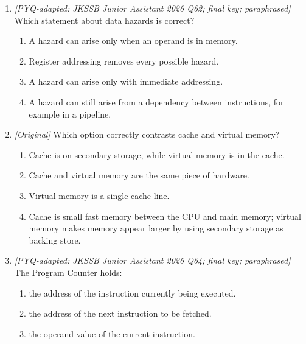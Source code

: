 \documentclass[11pt]{article}
\begin{document}
\begin{enumerate}[label=\textbf{Q\arabic*.}, leftmargin=*]
  \begin{enumerate}[label=\Alph*.]
    \item The cache is located on secondary storage.
    \item The cache stores only instructions, never data.
    \item The cache is smaller and faster and sits closer to the CPU, so its
      access time is lower than main memory.
    \item The cache runs at the same speed as a hard disk.
  \end{enumerate}
\item \textit{[PYQ-adapted: JKSSB Junior Assistant 2026 Q62; final key;
paraphrased]} Which statement about data hazards is correct?
  \begin{enumerate}[label=\Alph*.]
    \item A hazard can arise only when an operand is in memory.
    \item Register addressing removes every possible hazard.
    \item A hazard can arise only with immediate addressing.
    \item A hazard can still arise from a dependency between instructions,
      for example in a pipeline.
  \end{enumerate}
\item \textit{[Original]} Which option correctly contrasts cache and virtual
memory?
  \begin{enumerate}[label=\Alph*.]
    \item Cache is on secondary storage, while virtual memory is in the
      cache.
    \item Cache and virtual memory are the same piece of hardware.
    \item Virtual memory is a single cache line.
    \item Cache is small fast memory between the CPU and main memory;
      virtual memory makes memory appear larger by using secondary storage as
      backing store.
  \end{enumerate}
\item \textit{[PYQ-adapted: JKSSB Junior Assistant 2026 Q64; final key;
paraphrased]} The Program Counter holds:
  \begin{enumerate}[label=\Alph*.]
    \item the address of the instruction currently being executed.
    \item the address of the next instruction to be fetched.
    \item the operand value of the current instruction.

\end{enumerate}
\end{enumerate}
\end{document}
